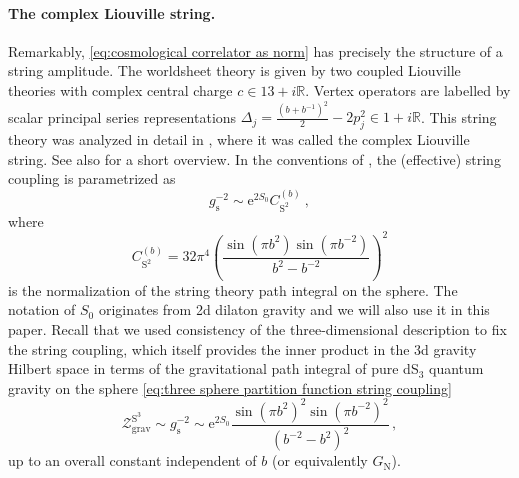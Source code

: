 \documentclass[12pt,a4paper]{article}
\newcommand{\be}{\begin{equation}}
\newcommand{\ee}{\end{equation}}
\newcommand\RR{\mathbb{R}}
\begin{document}
\paragraph{The complex Liouville string.} Remarkably, \eqref{eq:cosmological correlator as norm} has precisely the structure of a string amplitude. The worldsheet theory is given by two coupled Liouville theories with complex central charge $c \in 13+i \RR$. Vertex operators are labelled by scalar principal series representations $\Delta_j=\frac{(b+b^{-1})^2}{2}-2p_j^2 \in 1+i \RR$. This string theory was analyzed in detail in \cite{paper1, paper2, paper3}, where it was called the complex Liouville string. See also \cite{Collier:2024kmo} for a short overview. In the conventions of \cite{paper1, paper3}, the (effective) string coupling is parametrized as 
\be 
 g_\text{s}^{-2} \sim \mathrm{e}^{2S_0} C_{\mathrm{S}^2}^{(b)}~, \label{eq:string coupling fixing}
\ee
where
\be 
C_{\mathrm{S}^2}^{(b)}=32\pi^4 \left(\frac{\sin(\pi b^2)\sin(\pi b^{-2})}{b^2-b^{-2}}\right)^2 \label{eq:CS2}
\ee
is the normalization of the string theory path integral on the sphere.  The notation of $S_0$ originates from 2d dilaton gravity \cite{Saad:2019lba} and we will also use it in this paper.
Recall that we used consistency of the three-dimensional description to fix the string coupling, which itself provides the inner product in the 3d gravity Hilbert space in terms of the gravitational path integral of pure dS$_3$ quantum gravity on the sphere \eqref{eq:three sphere partition function string coupling}
\begin{equation}\label{eq:ZS3 in terms of string coupling}
    \mathcal{Z}_{\text{grav}}^{\text{S}^3} \sim g_{\text{s}}^{-2} \sim \mathrm{e}^{2S_0} \frac{\sin(\pi b^2)^2\sin(\pi b^{-2})^2}{(b^{-2}-b^2)^2}\, ,
\end{equation}
up to an overall constant independent of $b$ (or equivalently $G_{\text{N}}$).
\end{document}
